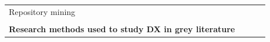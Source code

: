 \documentclass[english, 12pt, a4paper, sci, utf8, a-1b, online]{aaltothesis}
\begin{document}
{\begin{center}
\begin{longtable}{p{0.3\linewidth}p{0.6\linewidth}}
      Repository mining                            & \textcite{fontao2017facing} \newline \textcite{de2017towards} \newline \textcite{claussen2019role}                                                                                                                                                                                                                                                                                                                                                                                                                                                                                                                                                                                                                                                                                                                                                                                                                                                 \\
      &                                                                                                                                                                                                                                                                                                                                                                                                                                                                                                                                                                                                                                                                                                                                                                                                                                                                                                                                                    \\
      \multicolumn{2}{l}{\textbf{Research methods used to study DX in grey literature}}                                                                                                                                                                                                                                                                                                                                                                                                                                                                                                                                                                                                                                                                                                                                                                                                                                                                                                                                                      \\

\end{longtable}
\end{center}}
\end{document}
